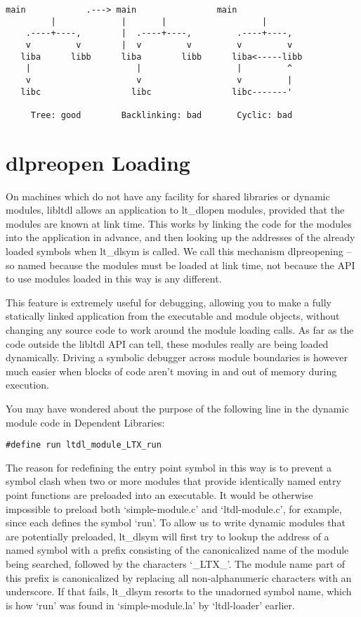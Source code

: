 \begin{Verbatim}[frame=single]
       main            .---> main                main
         |             |       |                   |
    .----+----,        |  .----+----,         .----+----,
    v         v        |  v         v         v         v
   liba      libb      liba        libb      liba<-----libb
    |                     |                   |         ^
    v                     v                   v         |
   libc                  libc                libc-------'

     Tree: good        Backlinking: bad       Cyclic: bad
\end{Verbatim}

\section{dlpreopen Loading}\label{S_dlpreopen_Loading}

On machines which do not have any facility for shared libraries or dynamic modules, libltdl allows an application to lt\_{}dlopen modules, provided that the modules are known at link time. This works by linking the code for the modules into the application in advance, and then looking up the addresses of the already loaded symbols when lt\_{}dlsym is called. We call this mechanism dlpreopening -- so named because the modules must be loaded at link time, not because the API to use modules loaded in this way is any different.

This feature is extremely useful for debugging, allowing you to make a fully statically linked application from the executable and module objects, without changing any source code to work around the module loading calls. As far as the code outside the libltdl API can tell, these modules really are being loaded dynamically. Driving a symbolic debugger across module boundaries is however much easier when blocks of code aren't moving in and out of memory during execution.

You may have wondered about the purpose of the following line in the dynamic module code in Dependent Libraries: 

\begin{Verbatim}[frame=single]
#define run ltdl_module_LTX_run
\end{Verbatim}

The reason for redefining the entry point symbol in this way is to prevent a symbol clash when two or more modules that provide identically named entry point functions are preloaded into an executable. It would be otherwise impossible to preload both `simple-module.c' and `ltdl-module.c', for example, since each defines the symbol `run'. To allow us to write dynamic modules that are potentially preloaded, lt\_{}dlsym will first try to lookup the address of a named symbol with a prefix consisting of the canonicalized name of the module being searched, followed by the characters `\_{}LTX\_{}'. The module name part of this prefix is canonicalized by replacing all non-alphanumeric characters with an underscore. If that fails, lt\_{}dlsym resorts to the unadorned symbol name, which is how `run' was found in `simple-module.la' by `ltdl-loader' earlier.

